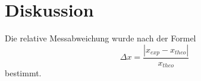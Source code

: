 \section{Diskussion}
\label{sec:Diskussion}

Die relative Messabweichung wurde nach der Formel 
\begin{equation}
    \Delta x =   \frac{ \left| x_{exp} - x_{theo} \right|   }{x_{theo}}  
    \label{eq:abweichung}
\end{equation}
bestimmt.


\clearpage